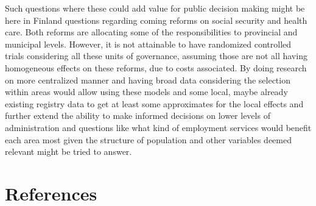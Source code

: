 \documentclass[main=english,12pt,a4paper,pdftex,econ,utf8]{aaltothesis}
\begin{document}
Such questions where these could add value for public decision making might be here in Finland questions regarding coming reforms on social security and health care. Both reforms are allocating some of the responsibilities to provincial and municipal levels. However, it is not attainable to have randomized controlled trials considering all these units of governance, assuming those are not all having homogeneous effects on these reforms, due to costs associated. By doing research on more centralized manner and having broad data considering the selection within areas would allow using these models and some local, maybe already existing registry data to get at least some approximates for the local effects and further extend the ability to make informed decisions on lower levels of administration and questions like what kind of employment services would benefit each area most given the structure of population and other variables deemed relevant might be tried to answer.

\clearpage

\section*{References}
\printbibliography[
    heading=subbibintoc,
    type=article,
    title={Articles \& seminar papers}
]
\printbibliography[
    heading=subbibintoc,
    type=book,
    title={Books}
]
\printbibliography[
    heading=subbibintoc,
    type=misc,
    title={Other sources}
]

\clearpage
\end{document}
